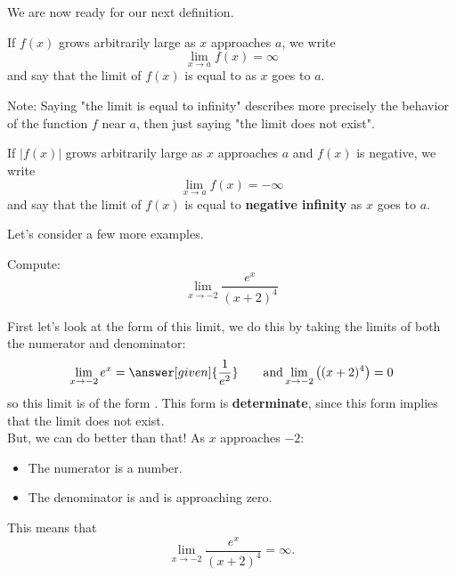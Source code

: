 \documentclass{ximera}
\begin{document}
\begin{image}
\end{image}

We are now ready for our next definition.

\begin{definition}
If $f(x)$ grows arbitrarily large as $x$ approaches $a$, we write
\[
\lim_{x\to a} f(x) = \infty
\]
and say that the limit of $f(x)$ is equal to  as $x$
goes to $a$.\\
\end{definition}
Note: Saying "the limit is equal to infinity"  describes more precisely the behavior of the function $f$ near $a$, then just saying "the limit does not exist".\\
\begin{definition}
If $|f(x)|$ grows arbitrarily large as $x$ approaches $a$ and $f(x)$ is
negative, we write
\[
\lim_{x\to a} f(x) = -\infty
\]
and say that the limit of $f(x)$ is equal to \textbf{ negative infinity}
as $x$ goes to $a$.

\end{definition}

Let's consider a few more examples.

\begin{example}
  Compute:
  \[
  \lim_{x\to -2} \frac{e^x}{(x+2)^4}
  \]
  \begin{explanation}
    First let's look at the form of this limit, we do this by taking the limits of both the numerator and denominator:
    \[
    \lim_{x\to -2} e^x = \answer[given]{\frac{1}{e^2}}\qquad\text{and}\lim_{x\to-2}\left((x+2)^4\right) = 0
    \]
    so this limit is of the form \numOverZero. This form is \textbf{determinate}, since this form implies that  the limit does not exist.\\
    But, we can do better than that!
     As $x$ approaches $-2$:
    \begin{itemize}
    \item The numerator is a  number. 
    \item The denominator is  and is approaching zero.
    \end{itemize}
    This means that
    \[
    \lim_{x\to -2} \frac{e^x}{(x+2)^4} = \infty.
    \]
  \end{explanation}
\end{example}
\end{document}
